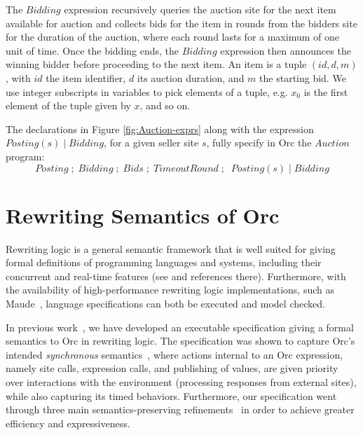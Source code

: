 \documentclass{eptcs}
\begin{document}
The $\mathit{Bidding}$ expression recursively queries the auction site for the next item available for auction and collects bids for the item in rounds from the bidders site for the duration of the auction, where each round lasts for a maximum of one unit of time. Once the bidding ends, the $\mathit{Bidding}$ expression then announces the winning bidder before proceeding to the next item. An item is a tuple $(id, d, m)$, with $id$ the item identifier, $d$ its auction duration, and $m$ the starting bid. We use integer subscripts in variables to pick elements of a tuple, e.g. $x_{0}$ is the first element of the tuple given by $x$, and so on.

The declarations in Figure \ref{fig:Auction-exprs} along with the expression $\mathit{Posting(s)} \;|\; \mathit{Bidding}$, for a given seller site $s$, fully specify in Orc the $\mathit{Auction}$ program:
\[ \mathit{Posting}\;;\; \mathit{Bidding}\;;\; \mathit{Bids}\;;\; \mathit{TimeoutRound}\;;\;\;  \mathit{Posting(s)} \;|\; \mathit{Bidding}\]




\section{Rewriting Semantics of Orc} \label{sec:rewriting-semantics}



Rewriting logic \cite{RL92} is a general semantic framework that is well suited for giving formal  
definitions of programming languages and systems, including their concurrent and real-time features (see
\cite{meseguer-rosu-ijcar04,meseguer-rosu-tcs,journ-rtm} and references there).
Furthermore, with the availability of high-performance
rewriting logic implementations, such as Maude~\cite{maude-book},
language specifications can both be executed and model checked.

In previous work~\cite{AlTurkiM07WWV}, we have developed an executable specification giving a formal semantics to Orc in rewriting logic. The specification was shown to capture Orc's intended \emph{synchronous} semantics~\cite{AlTurkiM07tr}, where actions internal to an Orc expression, namely site calls, expression calls, and publishing of values, are given priority over interactions with the environment (processing responses from external sites), while also capturing its timed behaviors. Furthermore, our specification went through three main semantics-preserving refinements~\cite{AlTurkiM07PPDP,AlTurkiM07tr,AlTurkiM07WWV} in order to achieve greater efficiency and expressiveness. 
\end{document}
